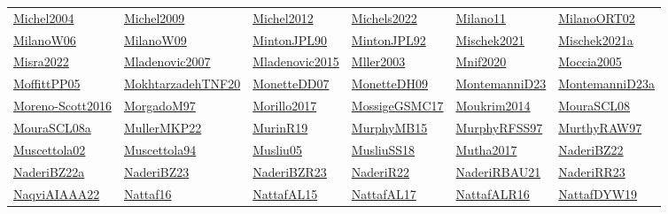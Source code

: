 \begin{longtable}{*{6}{l}}
\hyperref[detail:Michel2004]{Michel2004} & \hyperref[detail:Michel2009]{Michel2009} & \hyperref[detail:Michel2012]{Michel2012} & \hyperref[detail:Michels2022]{Michels2022} & \hyperref[detail:Milano11]{Milano11} & \hyperref[detail:MilanoORT02]{MilanoORT02}\\ 
\hyperref[detail:MilanoW06]{MilanoW06} & \hyperref[detail:MilanoW09]{MilanoW09} & \hyperref[detail:MintonJPL90]{MintonJPL90} & \hyperref[detail:MintonJPL92]{MintonJPL92} & \hyperref[detail:Mischek2021]{Mischek2021} & \hyperref[detail:Mischek2021a]{Mischek2021a}\\ 
\hyperref[detail:Misra2022]{Misra2022} & \hyperref[detail:Mladenovic2007]{Mladenovic2007} & \hyperref[detail:Mladenovic2015]{Mladenovic2015} & \hyperref[detail:Mller2003]{Mller2003} & \hyperref[detail:Mnif2020]{Mnif2020} & \hyperref[detail:Moccia2005]{Moccia2005}\\ 
\hyperref[detail:MoffittPP05]{MoffittPP05} & \hyperref[detail:MokhtarzadehTNF20]{MokhtarzadehTNF20} & \hyperref[detail:MonetteDD07]{MonetteDD07} & \hyperref[detail:MonetteDH09]{MonetteDH09} & \hyperref[detail:MontemanniD23]{MontemanniD23} & \hyperref[detail:MontemanniD23a]{MontemanniD23a}\\ 
\hyperref[detail:Moreno-Scott2016]{Moreno-Scott2016} & \hyperref[detail:MorgadoM97]{MorgadoM97} & \hyperref[detail:Morillo2017]{Morillo2017} & \hyperref[detail:MossigeGSMC17]{MossigeGSMC17} & \hyperref[detail:Moukrim2014]{Moukrim2014} & \hyperref[detail:MouraSCL08]{MouraSCL08}\\ 
\hyperref[detail:MouraSCL08a]{MouraSCL08a} & \hyperref[detail:MullerMKP22]{MullerMKP22} & \hyperref[detail:MurinR19]{MurinR19} & \hyperref[detail:MurphyMB15]{MurphyMB15} & \hyperref[detail:MurphyRFSS97]{MurphyRFSS97} & \hyperref[detail:MurthyRAW97]{MurthyRAW97}\\ 
\hyperref[detail:Muscettola02]{Muscettola02} & \hyperref[detail:Muscettola94]{Muscettola94} & \hyperref[detail:Musliu05]{Musliu05} & \hyperref[detail:MusliuSS18]{MusliuSS18} & \hyperref[detail:Mutha2017]{Mutha2017} & \hyperref[detail:NaderiBZ22]{NaderiBZ22}\\ 
\hyperref[detail:NaderiBZ22a]{NaderiBZ22a} & \hyperref[detail:NaderiBZ23]{NaderiBZ23} & \hyperref[detail:NaderiBZR23]{NaderiBZR23} & \hyperref[detail:NaderiR22]{NaderiR22} & \hyperref[detail:NaderiRBAU21]{NaderiRBAU21} & \hyperref[detail:NaderiRR23]{NaderiRR23}\\ 
\hyperref[detail:NaqviAIAAA22]{NaqviAIAAA22} & \hyperref[detail:Nattaf16]{Nattaf16} & \hyperref[detail:NattafAL15]{NattafAL15} & \hyperref[detail:NattafAL17]{NattafAL17} & \hyperref[detail:NattafALR16]{NattafALR16} & \hyperref[detail:NattafDYW19]{NattafDYW19}\\ 

\end{longtable}
